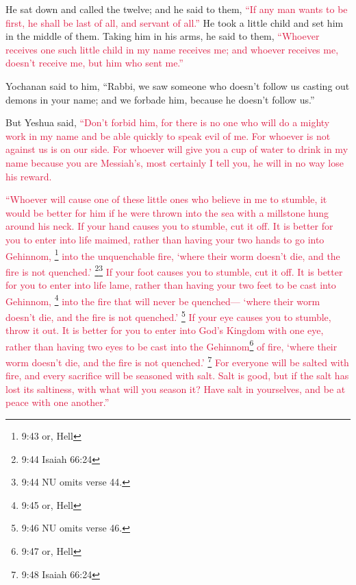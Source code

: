 \myverse{}He sat down and called the twelve; and he said to them,
\textcolor{crimson}{“If any man wants to be first, he shall be last of all, and servant of all.”}
\myverse{}He took a little child and set him in the middle of them. Taking him in his
arms, he said to them,
\myverse{}\textcolor{crimson}{“Whoever receives one such little child in my name receives me; and whoever
	receives me, doesn’t receive me, but him who sent me.”}

\myverse{}Yochanan said to him, “Rabbi, we saw someone who doesn’t follow
us casting out demons in your name; and we forbade him, because he doesn’t follow us.”

\myverse{}But Yeshua said,
\textcolor{crimson}{“Don’t forbid him, for there is no one who will do a mighty work in my name and be able quickly to
	speak evil of me.
}
\myverse{}\textcolor{crimson}{For whoever is not against us is on our side.
}
\myverse{}\textcolor{crimson}{For whoever will give you a cup of water to drink in my name because you
	are Messiah’s, most certainly I tell you, he will in no way lose his reward.
}

\myverse{}\textcolor{crimson}{“Whoever will cause one of these little ones who believe
	in me to stumble, it would be better for him if he were thrown into the sea with a millstone hung around
	his neck.
}
\myverse{}\textcolor{crimson}{If your hand causes you to stumble, cut it off. It is better for you to
	enter into life maimed, rather than having your two hands to go into Gehinnom,
}\footnote{9:43 or, Hell}
\textcolor{crimson}{into the unquenchable fire,
}
\myverse{}\textcolor{crimson}{‘where their worm doesn’t die, and the fire is not quenched.’
}\footnote{9:44 Isaiah 66:24}\footnote{9:44 NU omits verse 44.}
\myverse{}\textcolor{crimson}{If your foot causes you to stumble, cut it off. It is better for you to
	enter into life lame, rather than having your two feet to be cast into Gehinnom,
}\footnote{9:45 or, Hell}
\textcolor{crimson}{into the fire that will never be quenched—}
\myverse{}\textcolor{crimson}{‘where their worm doesn’t die, and the fire is not quenched.’
}\footnote{9:46 NU omits verse 46.}
\myverse{}\textcolor{crimson}{If your eye causes you to stumble, throw it out. It is better for you
	to enter into God’s Kingdom with one eye, rather than having two eyes to be cast into the Gehinnom}\footnote{9:47 or, Hell}
\textcolor{crimson}{of fire,
}
\myverse{}\textcolor{crimson}{‘where their worm doesn’t die, and the fire is not quenched.’
}\footnote{9:48 Isaiah 66:24}
\myverse{}\textcolor{crimson}{For everyone will be salted with fire, and every sacrifice will be seasoned
	with salt.
}
\myverse{}\textcolor{crimson}{Salt is good, but if the salt has lost its saltiness, with what will you
	season it? Have salt in yourselves, and be at peace with one another.”
}


